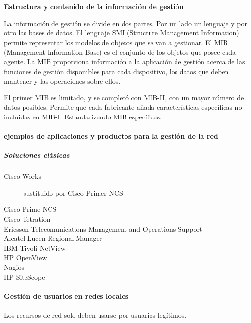                \textbf{Estructura y contenido de la información de gestión}

                La información de gestión se divide en dos partes. Por un lado un lenguaje y por otro las bases de datos. El lenguaje SMI (Structure Management Information) permite representar los modelos de objetos que se van a gestionar. El MIB (Management Information Base) es el conjunto de los objetos que posee cada agente. La MIB proporciona información a la aplicación de gestión acerca de las funciones de gestión disponibles para cada dispositivo, los datos que deben mantener y las operaciones sobre ellos.

                El primer MIB es limitado, y se completó con MIB-II, con un mayor número de datos posibles. Permite que cada fabricante añada características específicas no incluidas en MIB-I. Estandarizando MIB específicas.


        \paragraph{ejemplos de aplicaciones y productos para la gestión de la red} %
            \subparagraph{Soluciones clásicas} %
                \begin{description}
                    \item[Cisco Works] sustituido por Cisco Primer NCS
                    \item[Cisco Prime NCS]
                    \item[Cisco Tetration]
                    \item[Ericsson Telecomunications Management and Operations Support]
                    \item[Alcatel-Lucen Regional Manager]
                    \item[IBM Tivoli NetView]
                    \item[HP OpenView]
                    \item[Nagios]
                    \item[HP SiteScope]
                \end{description}

        \paragraph{Gestión de usuarios en redes locales} %
            Los recursos de red solo deben usarse por usuarios legítimos.

